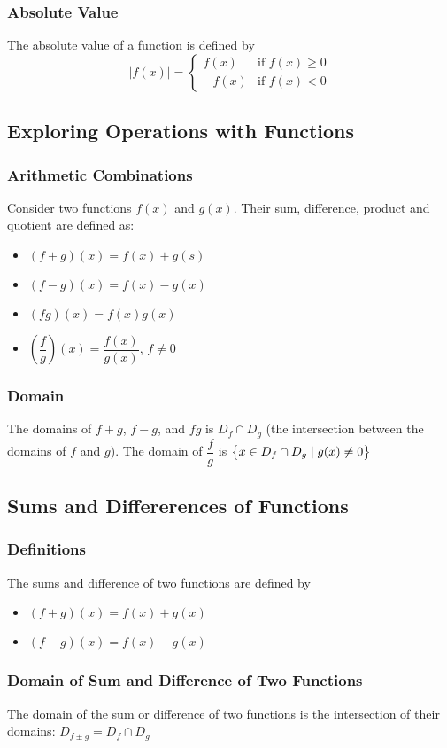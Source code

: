 \documentclass{article}
\begin{document}
	\subsubsection{Absolute Value}
	The absolute value of a function is defined by
	\[|f(x)|=\begin{cases}
		f(x)&\text{if }f(x)\geq0\\
		-f(x)&\text{if }f(x)<0
	\end{cases}\]
	\subsection{Exploring Operations with Functions}
	\subsubsection{Arithmetic Combinations}
	Consider two functions $f(x)$ and $g(x)$. Their sum, difference, product and quotient are defined as:
	\begin{itemize}
		\item $(f+g)(x)=f(x)+g(s)$
		\item $(f-g)(x)=f(x)-g(x)$
		\item $(fg)(x)=f(x)g(x)$
		\item $\left(\dfrac{f}{g}\right)(x)=\dfrac{f(x)}{g(x)}$, $f\neq0$
	\end{itemize}
	\subsubsection{Domain}
	The domains of $f+g$, $f-g$, and $fg$ is $D_f\cap D_g$ (the intersection between the domains of $f$ and $g$). The domain of $\dfrac{f}{g}$ is $\set{x\in D_f\cap D_g\mid g(x)\neq0}$
	\setcounter{section}{9}
	\setcounter{subsection}{1}
	\subsection{Sums and Differerences of Functions}
	\subsubsection{Definitions}
	The sums and difference of two functions are defined by
	\begin{itemize}
		\item $(f+g)(x)=f(x)+g(x)$
		\item $(f-g)(x)=f(x)-g(x)$
	\end{itemize}
	\subsubsection{Domain of Sum and Difference of Two Functions}
	The domain of the sum or difference of two functions is the intersection of their domains: $D_{f\pm g}=D_f\cap D_g$
\end{document}
